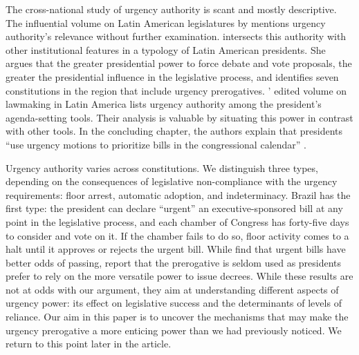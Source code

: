 \documentclass[letter,12pt]{article}
\begin{document}
The cross-national study of urgency authority is scant and mostly descriptive. The influential volume on Latin American legislatures by \citet{morgenstern.nacif.2002} mentions urgency authority's relevance without further examination. \citet{garcia.montero.presidentes.2009} intersects this authority with other institutional features in a typology of Latin American presidents. She argues that the greater presidential power to force debate and vote proposals, the greater the presidential influence in the legislative process, and identifies seven constitutions in the region that include urgency prerogatives. \citeauthor{aleman-tsebelis-2016-book}' \citeyearpar{aleman-tsebelis-2016-book} edited volume on lawmaking in Latin America lists urgency authority among the president's agenda-setting tools. Their analysis is valuable by situating this power in contrast with other tools. In the concluding chapter, the authors explain that presidents ``use urgency motions to prioritize bills in the congressional calendar'' \citep[][, 229]{aleman-tsebelis-2016-book}. 

Urgency authority varies across constitutions. We distinguish three types, depending on the consequences of legislative non-compliance with the urgency requirements: floor arrest, automatic adoption, and indeterminacy. Brazil has the first type: the president can declare ``urgent'' an executive-sponsored bill at any point in the legislative process, and each chamber of Congress has forty-five days to consider and vote on it. If the chamber fails to do so, floor activity comes to a halt until it approves or rejects the urgent bill. While \citet{hiroi-renno-2016} find that urgent bills have better odds of passing, \citet{figueiredo.limongi.2000} report that the prerogative is seldom used as presidents prefer to rely on the more versatile power to issue decrees. While these results are not at odds with our argument, they aim at understanding different aspects of urgency power: its effect on legislative success and the determinants of levels of reliance. Our aim in this paper is to uncover the mechanisms that may make the urgency prerogative a more enticing power than we had previously noticed. We return to this point later in the article. 
\end{document}
